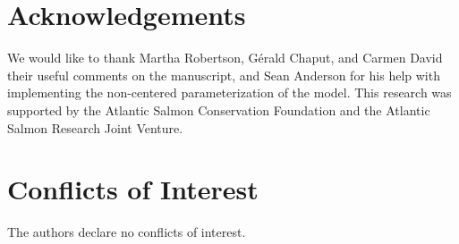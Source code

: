 \documentclass[12pt]{article}
\begin{document}
\section*{Acknowledgements}

We would like to thank Martha Robertson, G\'{e}rald Chaput, and Carmen David their useful 
comments on the manuscript, and Sean Anderson for his help with implementing the
non-centered parameterization of the model. This research was supported by the
Atlantic Salmon Conservation Foundation and the Atlantic Salmon Research Joint
Venture.

\section*{Conflicts of Interest}

The authors declare no conflicts of interest.
 


%
\end{document}
